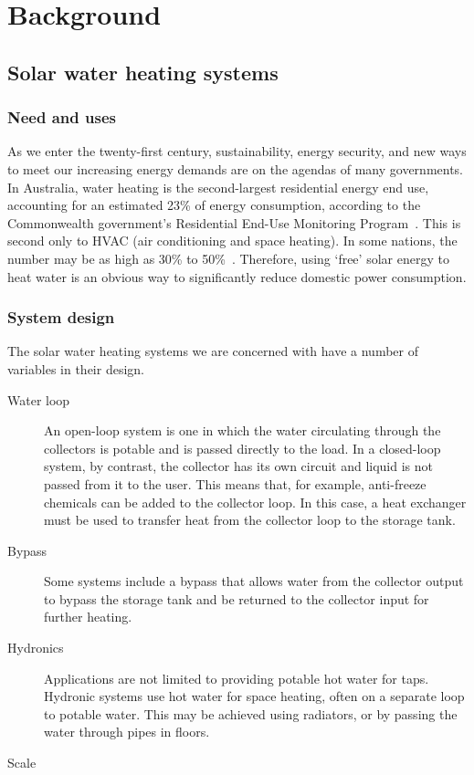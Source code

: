 \chapter{Background}
\label{ch:background}

\section{Solar water heating systems}

\subsection{Need and uses}

As we enter the twenty-first century, sustainability, energy security, and new ways to meet our increasing energy demands are on the agendas of many governments.
In Australia, water heating is the second-largest residential energy end use, accounting for an estimated 23\% of energy consumption, according to the Commonwealth government's Residential End-Use Monitoring Program~\cite{REMP12}.
This is second only to HVAC (air conditioning and space heating).
In some nations, the number may be as high as 30\% to 50\%~\cite{Lane96}.
Therefore, using `free' solar energy to heat water is an obvious way to significantly reduce domestic power consumption.

\subsection{System design}

The solar water heating systems we are concerned with have a number of variables in their design.

\begin{description}
   \item[Water loop] An open-loop system is one in which the water circulating through the collectors is potable and is passed directly to the load.
      In a closed-loop system, by contrast, the collector has its own circuit and liquid is not passed from it to the user.
      This means that, for example, anti-freeze chemicals can be added to the collector loop.
      In this case, a heat exchanger must be used to transfer heat from the collector loop to the storage tank.

   \item[Bypass] Some systems include a bypass  that allows water from the collector output to bypass the storage tank and be returned to the collector input for further heating.

   \item[Hydronics] Applications are not limited to providing potable hot water for taps.
      Hydronic systems use hot water for space heating, often on a separate loop to potable water.
      This may be achieved using radiators, or by passing the water through pipes in floors.

   \item[Scale] 
\end{description}

